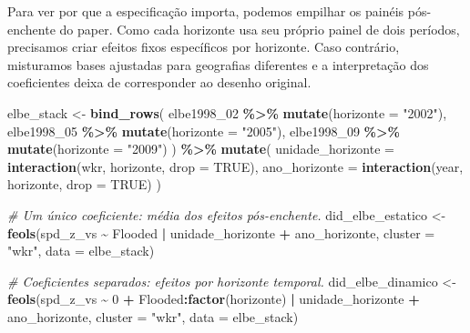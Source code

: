 \documentclass[
]{article}
\newenvironment{Shaded}{\begin{snugshade}}{\end{snugshade}}
\newcommand{\AttributeTok}[1]{\textcolor[rgb]{0.13,0.29,0.53}{#1}}
\newcommand{\CommentTok}[1]{\textcolor[rgb]{0.56,0.35,0.01}{\textit{#1}}}
\newcommand{\ConstantTok}[1]{\textcolor[rgb]{0.56,0.35,0.01}{#1}}
\newcommand{\DecValTok}[1]{\textcolor[rgb]{0.00,0.00,0.81}{#1}}
\newcommand{\FunctionTok}[1]{\textcolor[rgb]{0.13,0.29,0.53}{\textbf{#1}}}
\newcommand{\NormalTok}[1]{#1}
\newcommand{\OtherTok}[1]{\textcolor[rgb]{0.56,0.35,0.01}{#1}}
\newcommand{\SpecialCharTok}[1]{\textcolor[rgb]{0.81,0.36,0.00}{\textbf{#1}}}
\newcommand{\StringTok}[1]{\textcolor[rgb]{0.31,0.60,0.02}{#1}}
\begin{document}
Para ver por que a especificação importa, podemos empilhar os painéis pós-enchente do paper. Como cada horizonte usa seu próprio painel de dois períodos, precisamos criar efeitos fixos específicos por horizonte. Caso contrário, misturamos bases ajustadas para geografias diferentes e a interpretação dos coeficientes deixa de corresponder ao desenho original.

\begin{Shaded}
\begin{Highlighting}[]
\NormalTok{elbe\_stack }\OtherTok{\textless{}{-}} \FunctionTok{bind\_rows}\NormalTok{(}
\NormalTok{  elbe1998\_02 }\SpecialCharTok{\%\textgreater{}\%} \FunctionTok{mutate}\NormalTok{(}\AttributeTok{horizonte =} \StringTok{"2002"}\NormalTok{),}
\NormalTok{  elbe1998\_05 }\SpecialCharTok{\%\textgreater{}\%} \FunctionTok{mutate}\NormalTok{(}\AttributeTok{horizonte =} \StringTok{"2005"}\NormalTok{),}
\NormalTok{  elbe1998\_09 }\SpecialCharTok{\%\textgreater{}\%} \FunctionTok{mutate}\NormalTok{(}\AttributeTok{horizonte =} \StringTok{"2009"}\NormalTok{)}
\NormalTok{) }\SpecialCharTok{\%\textgreater{}\%}
  \FunctionTok{mutate}\NormalTok{(}
    \AttributeTok{unidade\_horizonte =} \FunctionTok{interaction}\NormalTok{(wkr, horizonte, }\AttributeTok{drop =} \ConstantTok{TRUE}\NormalTok{),}
    \AttributeTok{ano\_horizonte =} \FunctionTok{interaction}\NormalTok{(year, horizonte, }\AttributeTok{drop =} \ConstantTok{TRUE}\NormalTok{)}
\NormalTok{  )}

\CommentTok{\# Um único coeficiente: média dos efeitos pós{-}enchente.}
\NormalTok{did\_elbe\_estatico }\OtherTok{\textless{}{-}} \FunctionTok{feols}\NormalTok{(spd\_z\_vs }\SpecialCharTok{\textasciitilde{}}\NormalTok{ Flooded }\SpecialCharTok{|}\NormalTok{ unidade\_horizonte }\SpecialCharTok{+}\NormalTok{ ano\_horizonte,}
                           \AttributeTok{cluster =} \StringTok{"wkr"}\NormalTok{,}
                           \AttributeTok{data =}\NormalTok{ elbe\_stack)}

\CommentTok{\# Coeficientes separados: efeitos por horizonte temporal.}
\NormalTok{did\_elbe\_dinamico }\OtherTok{\textless{}{-}} \FunctionTok{feols}\NormalTok{(spd\_z\_vs }\SpecialCharTok{\textasciitilde{}} \DecValTok{0} \SpecialCharTok{+}\NormalTok{ Flooded}\SpecialCharTok{:}\FunctionTok{factor}\NormalTok{(horizonte) }\SpecialCharTok{|}
\NormalTok{                             unidade\_horizonte }\SpecialCharTok{+}\NormalTok{ ano\_horizonte,}
                           \AttributeTok{cluster =} \StringTok{"wkr"}\NormalTok{,}
                           \AttributeTok{data =}\NormalTok{ elbe\_stack)}


\end{Highlighting}
\end{Shaded}
\end{document}

